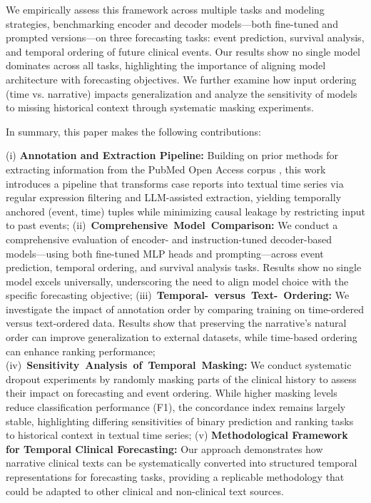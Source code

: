 \documentclass[letterpaper]{article} %
\begin{document}
We empirically assess this framework across multiple tasks and modeling strategies, benchmarking encoder and decoder models—both fine-tuned and prompted versions—on three forecasting tasks: event prediction, survival analysis, and temporal ordering of future clinical events. Our results show no single model dominates across all tasks, highlighting the importance of aligning model architecture with forecasting objectives. We further examine how input ordering (time vs. narrative) impacts generalization and analyze the sensitivity of models to missing historical context through systematic masking experiments.

In summary, this paper makes the following contributions:

(i) \textbf{Annotation and Extraction Pipeline:} Building on prior methods for extracting information from the PubMed Open Access corpus \cite{noroozizadeh2025reconstructing}, this work introduces a pipeline that transforms case reports into textual time series via regular expression filtering and LLM-assisted extraction, yielding temporally anchored (event, time) tuples while minimizing causal leakage by restricting input to past events;
\mbox{(ii) \textbf{Comprehensive Model Comparison:}} 
    We conduct a comprehensive evaluation of encoder- and instruction-tuned decoder-based models—using both fine-tuned MLP heads and prompting—across event prediction, temporal ordering, and survival analysis tasks. Results show no single model excels universally, underscoring the need to align model choice with the specific forecasting objective;
\mbox{(iii) \textbf{Temporal- versus Text- Ordering:}}
    We investigate the impact of annotation order by comparing training on time-ordered versus text-ordered data. Results show that preserving the narrative's natural order can improve generalization to external datasets, while time-based ordering can enhance ranking performance;
\mbox{(iv) \textbf{Sensitivity Analysis of Temporal Masking:}}
    We conduct systematic dropout experiments by randomly masking parts of the clinical history to assess their impact on forecasting and event ordering. While higher masking levels reduce classification performance (F1), the concordance index remains largely stable, highlighting differing sensitivities of binary prediction and ranking tasks to historical context in textual time series;
(v) \textbf{Methodological Framework for Temporal Clinical Forecasting:} Our approach demonstrates how narrative clinical texts can be systematically converted into structured temporal representations for forecasting tasks, providing a replicable methodology that could be adapted to other clinical and non-clinical text sources. 
\end{document}
